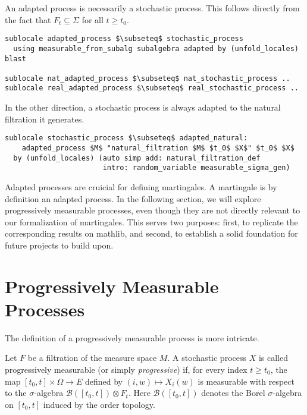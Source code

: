 An adapted process is necessarily a stochastic process. This follows directly from the fact that $F_t \subseteq \Sigma$ for all $t \ge t_0$.

\begin{isalemma}
{\small
\begin{lstlisting}[style=isabelle]
sublocale adapted_process $\subseteq$ stochastic_process 
  using measurable_from_subalg subalgebra adapted by (unfold_locales) blast

sublocale nat_adapted_process $\subseteq$ nat_stochastic_process ..
sublocale real_adapted_process $\subseteq$ real_stochastic_process ..
\end{lstlisting}
}
\end{isalemma}


In the other direction, a stochastic process is always adapted to the natural filtration it generates.

\begin{isalemma}
{\small
\begin{lstlisting}[style=isabelle]
sublocale stochastic_process $\subseteq$ adapted_natural: 
	adapted_process $M$ "natural_filtration $M$ $t_0$ $X$" $t_0$ $X$ 
  by (unfold_locales) (auto simp add: natural_filtration_def 
  					   intro: random_variable measurable_sigma_gen) 
\end{lstlisting}
}
\end{isalemma}

Adapted processes are cruicial for defining martingales. A martingale is by definition an adapted process. In the following section, we will explore progressively measurable processes, even though they are not directly relevant to our formalization of martingales. This serves two purposes: first, to replicate the corresponding results on \textsf{mathlib}, and second, to establish a solid foundation for future projects to build upon.

\section{Progressively Measurable Processes}

The definition of a progressively measurable process is more intricate.

\begin{definition}
	Let $F$ be a filtration of the measure space $M$. A stochastic process $X$ is called progressively measurable (or simply \textit{progressive}) if, for every index $t \ge t_0$, the map $[t_0, t] \times \Omega \rightarrow E$ defined by $(i, w) \mapsto X_i(w)$ is measurable with respect to the $\sigma$-algebra $\mathcal{B}([t_0, t]) \otimes F_t$. Here $\mathcal{B}([t_0, t])$ denotes the Borel $\sigma$-algebra on $[t_0, t]$ induced by the order topology.
\end{definition}

